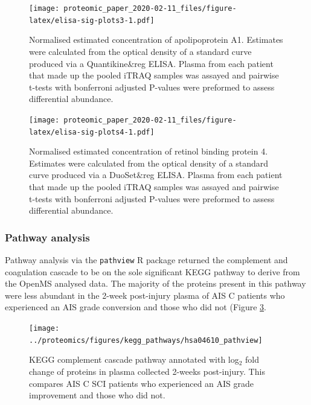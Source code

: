 \documentclass[
]{article}
\begin{document}
\begin{figure}
\centering
\texttt{[image: proteomic\_paper\_2020-02-11\_files/figure-latex/elisa-sig-plots3-1.pdf]}
\caption{\label{fig:elisa-sig-plots3}Normalised estimated concentration of apolipoprotein A1. Estimates were calculated from the optical density of a standard curve produced via a Quantikine\&reg ELISA. Plasma from each patient that made up the pooled iTRAQ samples was assayed and pairwise t-tests with bonferroni adjusted P-values were preformed to assess differential abundance.}
\end{figure}



\begin{figure}
\centering
\texttt{[image: proteomic\_paper\_2020-02-11\_files/figure-latex/elisa-sig-plots4-1.pdf]}
\caption{\label{fig:elisa-sig-plots4}Normalised estimated concentration of retinol binding protein 4. Estimates were calculated from the optical density of a standard curve produced via a DuoSet\&reg ELISA. Plasma from each patient that made up the pooled iTRAQ samples was assayed and pairwise t-tests with bonferroni adjusted P-values were preformed to assess differential abundance.}
\end{figure}

\hypertarget{kegg-chap3}{%
\subsubsection{Pathway analysis}\label{kegg-chap3}}

Pathway analysis via the \texttt{pathview} R package returned the complement and coagulation cascade to be on the sole significant KEGG pathway to derive from the OpenMS analysed data.
The majority of the proteins present in this pathway were less abundant in the 2-week post-injury plasma of AIS C patients who experienced an AIS grade conversion and those who did not (Figure \ref{fig:kegg-complement}.



\begin{figure}

{\centering \texttt{[image: ../proteomics/figures/kegg\_pathways/hsa04610\_pathview]} 

}

\caption{KEGG complement cascade pathway annotated with log\(_2\) fold change of proteins in plasma collected 2-weeks post-injury. This compares AIS C SCI patients who experienced an AIS grade improvement and those who did not.}\label{fig:kegg-complement}
\end{figure}
\end{document}
